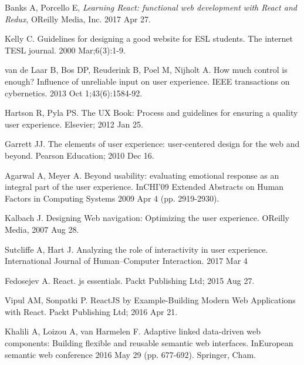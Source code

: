 

%

\begin{thebibliography}{1}


Banks A, Porcello E, \emph{Learning React: functional web development with React and Redux}, OReilly Media, Inc. 2017 Apr 27.

Kelly C. Guidelines for designing a good website for ESL students. The internet TESL journal. 2000 Mar;6(3):1-9.

van de Laar B, Bos DP, Reuderink B, Poel M, Nijholt A. How much control is enough? Influence of unreliable input on user experience. IEEE transactions on cybernetics. 2013 Oct 1;43(6):1584-92.

Hartson R, Pyla PS. The UX Book: Process and guidelines for ensuring a quality user experience. Elsevier; 2012 Jan 25.

Garrett JJ. The elements of user experience: user-centered design for the web and beyond. Pearson Education; 2010 Dec 16.

Agarwal A, Meyer A. Beyond usability: evaluating emotional response as an integral part of the user experience. InCHI'09 Extended Abstracts on Human Factors in Computing Systems 2009 Apr 4 (pp. 2919-2930).

Kalbach J. Designing Web navigation: Optimizing the user experience. OReilly Media, 2007 Aug 28.

Sutcliffe A, Hart J. Analyzing the role of interactivity in user experience. International Journal of Human–Computer Interaction. 2017 Mar 4


Fedosejev A. React. js essentials. Packt Publishing Ltd; 2015 Aug 27.


Vipul AM, Sonpatki P. ReactJS by Example-Building Modern Web Applications with React. Packt Publishing Ltd; 2016 Apr 21.

Khalili A, Loizou A, van Harmelen F. Adaptive linked data-driven web components: Building flexible and reusable semantic web interfaces. InEuropean semantic web conference 2016 May 29 (pp. 677-692). Springer, Cham.


\end{thebibliography}

